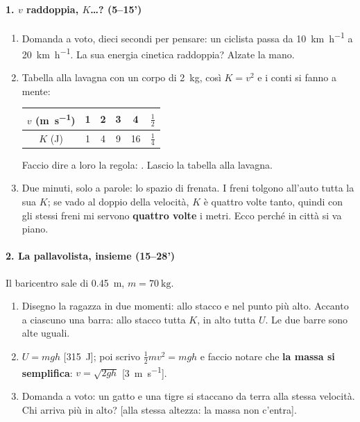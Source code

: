 \documentclass[11pt]{report}
\begin{document}
\paragraph{1. $v$ raddoppia, $K$\dots? (5--15')}
\begin{enumerate}
  \item Domanda a voto, dieci secondi per pensare: un ciclista passa da \SI{10}{\kilo\metre\per\hour} a \SI{20}{\kilo\metre\per\hour}. La sua energia cinetica raddoppia? Alzate la mano.
  \item Tabella alla lavagna con un corpo di \SI{2}{\kilogram}, così $K=v^2$ e i conti si fanno a mente:
  \begin{center}
  \begin{tabular}{c|ccccc}
    $v$ (\si{\metre\per\second}) & 1 & 2 & 3 & 4 & $\tfrac12$ \\ \hline
    $K$ (\si{\joule}) & 1 & 4 & 9 & 16 & $\tfrac14$
  \end{tabular}
  \end{center}
  Faccio dire a loro la regola: . Lascio la tabella alla lavagna.
  \item Due minuti, solo a parole: lo spazio di frenata. I freni tolgono all'auto tutta la sua $K$; se vado al doppio della velocità, $K$ è quattro volte tanto, quindi con gli stessi freni mi servono \textbf{quattro volte} i metri. Ecco perché in città si va piano.
\end{enumerate}

\paragraph{2. La pallavolista, insieme (15--28')}
Il baricentro sale di \SI{0.45}{\metre}, $m=\SI{70}{\kilogram}$.
\begin{enumerate}
  \item Disegno la ragazza in due momenti: allo stacco e nel punto più alto. Accanto a ciascuno una barra: allo stacco tutta $K$, in alto tutta $U$. Le due barre sono alte uguali.
  \item $U=mgh$ [\SI{315}{\joule}]; poi scrivo $\tfrac12 mv^2=mgh$ e faccio notare che \textbf{la massa si semplifica}: $v=\sqrt{2gh}$ [\SI{3}{\metre\per\second}].
  \item Domanda a voto: un gatto e una tigre si staccano da terra alla stessa velocità. Chi arriva più in alto? [alla stessa altezza: la massa non c'entra].
\end{enumerate}
\end{document}
